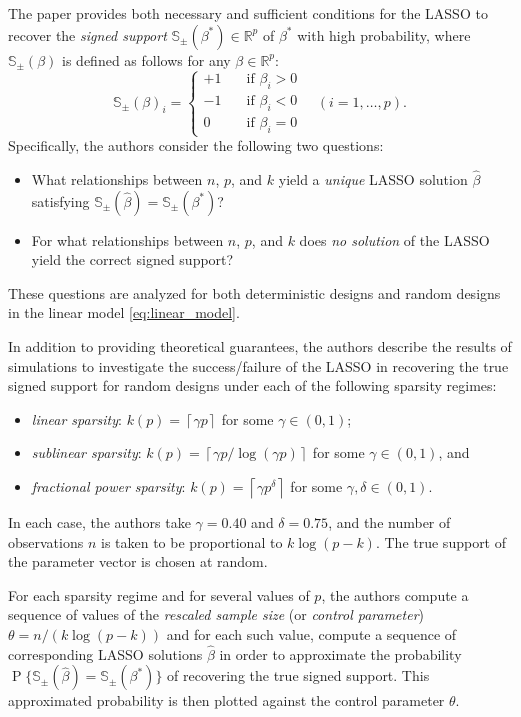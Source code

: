 \documentclass[letterpaper,12pt]{article}
\DeclareMathOperator{\prob}{P}
\newcommand{\ceil}[1]{\left\lceil#1\right\rceil}
\begin{document}
The paper \cite{wainwright06} provides both necessary and sufficient
conditions for the LASSO to recover the \textit{signed support}
$\mathbb{S}_\pm(\beta^\ast) \in \mathbb{R}^p$ of $\beta^\ast$ with
high probability, where $\mathbb{S}_\pm(\beta)$ is defined as follows
for any $\beta \in \mathbb{R}^p$:
\begin{equation*}
  \mathbb{S}_\pm(\beta)_i =
  \begin{cases}
    +1 & \quad \text{if $\beta_i > 0$} \\
    -1 & \quad \text{if $\beta_i < 0$} \\
    0 & \quad \text{if $\beta_i = 0$}
  \end{cases}
  \quad (i = 1, \ldots, p).
\end{equation*}
Specifically, the authors consider the following two questions:
\begin{itemize}
\item What relationships between $n$, $p$, and $k$ yield a
  \emph{unique} LASSO solution $\hat{\beta}$ satisfying
  $\mathbb{S}_\pm(\hat{\beta}) = \mathbb{S}_\pm(\beta^\ast)$?
\item For what relationships between $n$, $p$, and $k$ does \emph{no
    solution} of the LASSO yield the correct signed support?
\end{itemize}
These questions are analyzed for both deterministic designs and random
designs in the linear model \eqref{eq:linear_model}.

In addition to providing theoretical guarantees, the authors describe
the results of simulations to investigate the success/failure of the
LASSO in recovering the true signed support for random designs under
each of the following sparsity regimes:
\begin{itemize}
\item \textit{linear sparsity}: $k(p) = \ceil{\gamma p}$ for some
  $\gamma \in (0, 1)$;
\item \textit{sublinear sparsity}:
  $k(p) = \ceil{\gamma p / \log(\gamma p)}$ for some
  $\gamma \in (0, 1)$, and
\item \textit{fractional power sparsity}:
  $k(p) = \ceil{\gamma p^\delta}$ for some
  $\gamma, \delta \in (0, 1)$.
\end{itemize}
In each case, the authors take $\gamma = 0.40$ and $\delta = 0.75$,
and the number of observations $n$ is taken to be proportional to
$k\log(p - k)$. The true support of the parameter vector is chosen at
random.

For each sparsity regime and for several values of $p$, the authors
compute a sequence of values of the \textit{rescaled sample size} (or
\textit{control parameter}) $\theta = n / (k \log(p -k))$ and for each
such value, compute a sequence of corresponding LASSO solutions
$\hat{\beta}$ in order to approximate the probability
$\prob\{\mathbb{S}_\pm(\hat{\beta}) = \mathbb{S}_\pm(\beta^\ast)\}$ of
recovering the true signed support. This approximated probability is
then plotted against the control parameter $\theta$.
\end{document}
